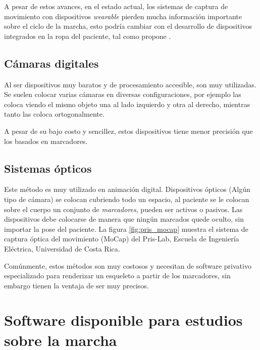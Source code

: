A pesar de estos avances, en el estado actual, los sistemas de captura de movimiento con dispositivos \emph{wearable} pierden mucha información importante sobre el ciclo de la marcha, esto podría cambiar con el desarrollo de dispositivos integrados en la ropa del paciente, tal como propone \cite{menguc}.

\subsection{Cámaras digitales} 

Al ser dispositivos muy baratos y de procesamiento accesible, son muy utilizadas. Se suelen colocar varias cámaras en diversas configuraciones, por ejemplo \cite{hoang} las coloca viendo el mismo objeto una al lado izquierdo y otra al derecho, mientras tanto \cite{li} las coloca ortogonalmente. 

A pesar de su bajo costo y sencillez, estos dispositivos tiene menor precisión que los basados en marcadores.

\subsection{Sistemas ópticos}

Este método es muy utilizado en animación digital. Dispositivos ópticos (Algún tipo de cámara) se colocan cubriendo todo un espacio, al paciente se le colocan sobre el cuerpo un conjunto de \emph{marcadores}, pueden ser activos o pasivos. Las dispositivos debe colocarse de manera que ningún marcados quede oculto, sin importar la pose del paciente. La figura \ref{fig:pris_mocap} muestra el sistema de captura óptica del movimiento (MoCap) del Pris-Lab, Escuela de Ingeniería Eléctrica, Universidad de Costa Rica. 

Comúnmente, estos métodos son muy costosos y necesitan de software privativo especializado para renderizar un esqueleto a partir de los marcadores, sin embargo tienen la ventaja de ser muy precisos. 

\section[Software disponible]{Software disponible para estudios sobre la marcha}

